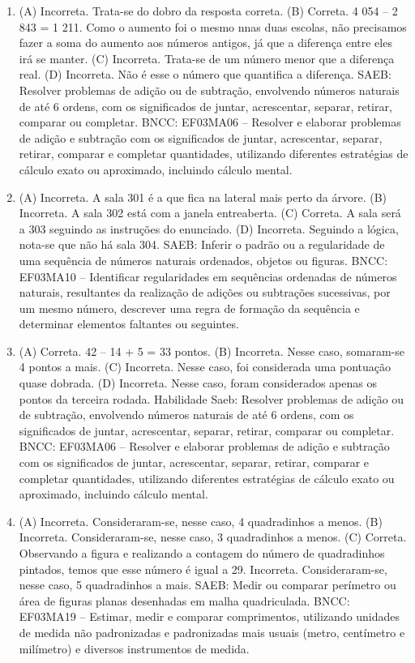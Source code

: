 \begin{enumerate}
\item
(A) Incorreta. Trata-se do dobro da resposta correta.
(B) Correta. 4 054 -- 2 843 = 1 211. Como o aumento foi o mesmo nnas duas escolas, não
precisamos fazer a soma do aumento aos números antigos, já que a diferença entre eles irá se manter.
(C) Incorreta. Trata-se de um número menor que a diferença real.
(D) Incorreta. Não é esse o número que quantifica a diferença.
SAEB: Resolver problemas de adição ou de subtração,
envolvendo números naturais de até 6 ordens, com os significados de
juntar, acrescentar, separar, retirar, comparar ou completar.
BNCC: EF03MA06 – Resolver e elaborar problemas de adição e subtração com os significados de
juntar, acrescentar, separar, retirar, comparar e completar quantidades, utilizando diferentes
estratégias de cálculo exato ou aproximado, incluindo cálculo mental.

\item
(A) Incorreta. A sala 301 é a que fica na lateral mais perto da árvore.
(B) Incorreta. A sala 302 está com a janela entreaberta.
(C) Correta. A sala será a 303 seguindo as instruções do enunciado.
(D) Incorreta. Seguindo a lógica, nota-se que não há sala 304.
SAEB: Inferir o padrão ou a regularidade de uma sequência de
números naturais ordenados, objetos ou figuras.
BNCC: EF03MA10 -- Identificar regularidades em sequências ordenadas de números naturais,
resultantes da realização de adições ou subtrações sucessivas, por um mesmo número,
descrever uma regra de formação da sequência e determinar elementos faltantes ou seguintes.

\item
(A) Correta. 42 -- 14 + 5 = 33 pontos.
(B) Incorreta. Nesse caso, somaram-se 4 pontos a mais.
(C) Incorreta. Nesse caso, foi considerada uma pontuação quase dobrada.
(D) Incorreta. Nesse caso, foram considerados apenas os pontos da terceira rodada.
Habilidade Saeb: Resolver problemas de adição ou de subtração,
envolvendo números naturais de até 6 ordens, com os significados de
juntar, acrescentar, separar, retirar, comparar ou completar.
BNCC: EF03MA06 – Resolver e elaborar problemas de adição e subtração com os significados de
juntar, acrescentar, separar, retirar, comparar e completar quantidades, utilizando diferentes
estratégias de cálculo exato ou aproximado, incluindo cálculo mental.

\item
(A) Incorreta. Consideraram-se, nesse caso, 4 quadradinhos a menos.
(B) Incorreta. Consideraram-se, nesse caso, 3 quadradinhos a menos.
(C) Correta. Observando a figura e realizando a contagem do número de quadradinhos
pintados, temos que esse número é igual a 29.
Incorreta. Consideraram-se, nesse caso, 5 quadradinhos a mais.
SAEB: Medir ou comparar perímetro ou área de figuras planas
desenhadas em malha quadriculada.
BNCC: EF03MA19 -- Estimar, medir e comparar comprimentos, utilizando unidades de medida
não padronizadas e padronizadas mais usuais (metro, centímetro e milímetro) e diversos
instrumentos de medida.


\end{enumerate}
